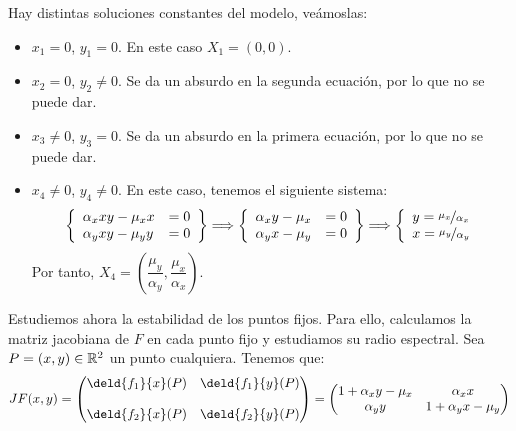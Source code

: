 \begin{ejercicio}
    Hay distintas soluciones constantes del modelo, veámoslas:
    \begin{itemize}
        \item $x_1=0$, $y_1=0$. En este caso $X_1=(0,0)$.
        \item $x_2=0$, $y_2\neq 0$. Se da un absurdo en la segunda ecuación, por lo que no se puede dar.
        \item $x_3\neq 0$, $y_3=0$. Se da un absurdo en la primera ecuación, por lo que no se puede dar.
        \item $x_4\neq 0$, $y_4\neq 0$. En este caso, tenemos el siguiente sistema:
        \begin{equation*}
            \left\{
                \begin{array}{lr}
                    \alpha_x xy - \mu_x x &=0\\
                    \alpha_y xy - \mu_y y &=0
                \end{array}
            \right\}
            \Longrightarrow
            \left\{
                \begin{array}{lr}
                    \alpha_x y - \mu_x &=0\\
                    \alpha_y x - \mu_y &=0
                \end{array}
            \right\}
            \Longrightarrow
            \left\{
                \begin{array}{l}
                    y=\nicefrac{\mu_x}{\alpha_x}\\
                    x=\nicefrac{\mu_y}{\alpha_y}
                \end{array}
            \right.
        \end{equation*}
        Por tanto, $X_4=\left(\dfrac{\mu_y}{\alpha_y},\dfrac{\mu_x}{\alpha_x}\right)$.
    \end{itemize}

    Estudiemos ahora la estabilidad de los puntos fijos. Para ello,
    calculamos la matriz jacobiana de $F$ en cada punto fijo y estudiamos
    su radio espectral. Sea $P=(x,y)\in \mathbb{R}^2$ un punto cualquiera. Tenemos que:
    \begin{equation*}
        JF(x,y) = \begin{pmatrix}
            \deld{f_1}{x}(P) & \deld{f_1}{y}(P)\\ \\
            \deld{f_2}{x}(P) & \deld{f_2}{y}(P)
        \end{pmatrix}
        = \begin{pmatrix}
            1 + \alpha_x y - \mu_x & \alpha_x x\\
            \alpha_y y & 1 + \alpha_y x - \mu_y
        \end{pmatrix}
    \end{equation*}


\end{ejercicio}
